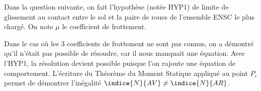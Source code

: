 \ifprof
\begin{corrige}
\end{corrige}
\else
\fi


\ifprof
\else
Dans la question suivante, on fait l'hypothèse (notée HYP1) de limite de glissement au contact
entre le sol et la paire de roues de l'ensemble ENSC le plus chargé. On note $\mu$ le coefficient
de frottement.
\fi

\ifprof
\begin{corrige}
Dans le cas où les 3 coefficients de frottement ne sont pas connus, on a démontré qu’il n’était pas possible de résoudre, car il nous manquait une équation.
Avec l’HYP1, la résolution devient possible puisque l’on rajoute une équation de comportement.
L’écriture du Théorème du Moment Statique appliqué au point $P_c$  permet de démontrer l’inégalité $\indice{N}{AV}\neq\indice{N}{AR}$.

\end{corrige}
\else
\fi

